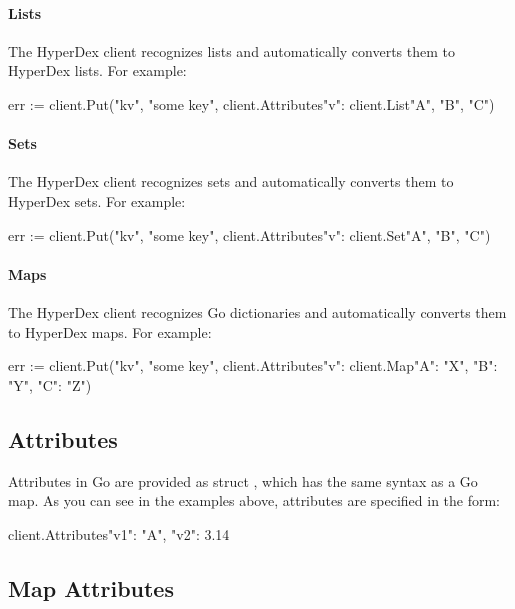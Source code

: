 \paragraph{Lists}

The HyperDex client recognizes lists and automatically converts them to HyperDex
lists.  For example:

\begin{gocode}
err := client.Put("kv", "some key", client.Attributes{"v": client.List{"A", "B", "C"}})
\end{gocode}

\paragraph{Sets}

The HyperDex client recognizes sets and automatically converts them to HyperDex
sets.  For example:

\begin{gocode}
err := client.Put("kv", "some key", client.Attributes{"v": client.Set{"A", "B", "C"}})
\end{gocode}

\paragraph{Maps}

The HyperDex client recognizes Go dictionaries and automatically converts them
to HyperDex maps.  For example:

\begin{gocode}
err := client.Put("kv", "some key", client.Attributes{"v":
        client.Map{"A": "X", "B": "Y", "C": "Z"}})
\end{gocode}

\subsection{Attributes}
\label{sec:api:go-client:attributes}

Attributes in Go are provided as struct , which has the
same syntax as a Go map.  As you can see in the examples above, attributes are
specified in the form:

\begin{gocode}
client.Attributes{"v1": "A", "v2": 3.14}
\end{gocode}

\subsection{Map Attributes}
\label{sec:api:go-client:map-attributes}

